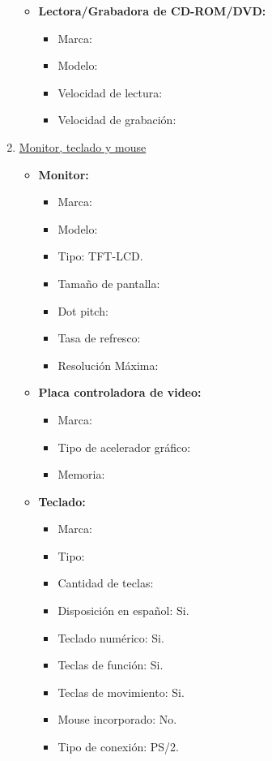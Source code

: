 \begin{enumerate}
\begin{itemize}
    \item \textbf{Lectora/Grabadora de CD-ROM/DVD:}
    \begin{itemize}
      \item Marca:
      \item Modelo:
      \item Velocidad de lectura:
      \item Velocidad de grabación:
    \end{itemize}
  \end{itemize}
  
  \item \underline{Monitor, teclado y mouse}
  \begin{itemize}
    \item \textbf{Monitor:}
    \begin{itemize}
      \item Marca:
      \item Modelo:
      \item Tipo: TFT-LCD.
      \item Tamaño de pantalla:
      \item Dot pitch:
      \item Tasa de refresco:
      \item Resolución Máxima:
    \end{itemize}
    
    \item \textbf{Placa controladora de video:}
    \begin{itemize}
      \item Marca:
      \item Tipo de acelerador gráfico:
      \item Memoria:
    \end{itemize}
    
    \item \textbf{Teclado:}
    \begin{itemize}
      \item Marca:
      \item Tipo:
      \item Cantidad de teclas:
      \item Disposición en español: Si.
      \item Teclado numérico: Si.
      \item Teclas de función: Si.
      \item Teclas de movimiento: Si.
      \item Mouse incorporado: No.
      \item Tipo de conexión: PS/2.
    \end{itemize}
    

\end{itemize}
\end{enumerate}
